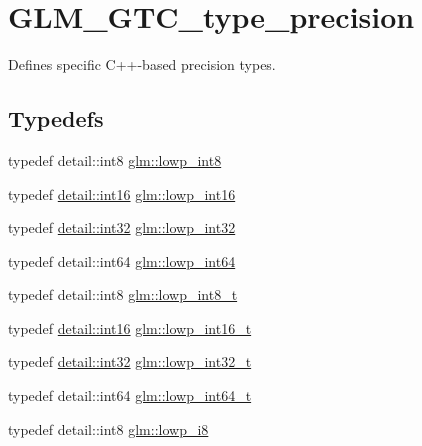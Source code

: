 \hypertarget{group__gtc__type__precision}{}\section{G\+L\+M\+\_\+\+G\+T\+C\+\_\+type\+\_\+precision}
\label{group__gtc__type__precision}


Defines specific C++-\/based precision types.  


\subsection*{Typedefs}
\begin{DoxyCompactItemize}
\item 
typedef detail\+::int8 \hyperlink{group__gtc__type__precision_gaf9e675b6392764242ae87eb179e9d3d6}{glm\+::lowp\+\_\+int8}
\item 
typedef \hyperlink{stb__image_8c_a259fa4834387bd68627ddf37bb3ebdb9}{detail\+::int16} \hyperlink{group__gtc__type__precision_ga71fc0c399fa4780507748b643733f153}{glm\+::lowp\+\_\+int16}
\item 
typedef \hyperlink{stb__image_8c_a43d43196463bde49cb067f5c20ab8481}{detail\+::int32} \hyperlink{group__gtc__type__precision_gad9939c9d6fec1c6accc02a83c6500f08}{glm\+::lowp\+\_\+int32}
\item 
typedef detail\+::int64 \hyperlink{group__gtc__type__precision_gab8a8e75af347592406e41b3ae2c0712b}{glm\+::lowp\+\_\+int64}
\item 
typedef detail\+::int8 \hyperlink{group__gtc__type__precision_gae6092311f6970a305c2df19a372360a3}{glm\+::lowp\+\_\+int8\+\_\+t}
\item 
typedef \hyperlink{stb__image_8c_a259fa4834387bd68627ddf37bb3ebdb9}{detail\+::int16} \hyperlink{group__gtc__type__precision_gae34c3d53c4c1434fc9f26538b0185667}{glm\+::lowp\+\_\+int16\+\_\+t}
\item 
typedef \hyperlink{stb__image_8c_a43d43196463bde49cb067f5c20ab8481}{detail\+::int32} \hyperlink{group__gtc__type__precision_gad9567c806dc39f534174eef42663119d}{glm\+::lowp\+\_\+int32\+\_\+t}
\item 
typedef detail\+::int64 \hyperlink{group__gtc__type__precision_ga14d72e76d57c7f28eca8e933816c9fd6}{glm\+::lowp\+\_\+int64\+\_\+t}
\item 
typedef detail\+::int8 \hyperlink{group__gtc__type__precision_gaa2e13ee29c90f75658beed6082541097}{glm\+::lowp\+\_\+i8}
\item 

\end{DoxyCompactItemize}
